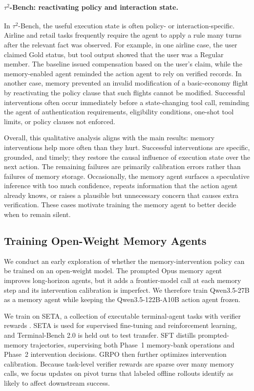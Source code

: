 \paragraph{$\tau^2$-Bench: reactivating policy and interaction state.}
In $\tau^2$-Bench, the useful execution state is often policy- or
interaction-specific. Airline and retail tasks frequently require the agent to
apply a rule many turns after the relevant fact was observed. For example, in
one airline case, the user claimed Gold status, but tool output showed that the
user was a Regular member. The baseline issued compensation based on the user's
claim, while the memory-enabled agent reminded the action agent to rely on
verified records. In another case, memory prevented an invalid modification of a
basic-economy flight by reactivating the policy clause that such flights cannot
be modified. Successful interventions often occur immediately before a
state-changing tool call, reminding the agent of authentication requirements,
eligibility conditions, one-shot tool limits, or policy clauses not enforced.

Overall, this qualitative analysis aligns with the main results: memory
interventions help more often than they hurt. Successful interventions are
specific, grounded, and timely; they restore the causal influence of execution
state over the next action. The remaining failures are primarily calibration
errors rather than failures of memory storage. Occasionally, the memory agent
surfaces a speculative inference with too much confidence, repeats information
that the action agent already knows, or raises a plausible but unnecessary
concern that causes extra verification. These cases motivate training the memory
agent to better decide when to remain silent.

\subsection{Training Open-Weight Memory Agents}
\label{sec:training}

We conduct an early exploration of whether the memory-intervention policy can be
trained on an open-weight model. The prompted Opus memory agent improves
long-horizon agents, but it adds a frontier-model call at each memory step and
its intervention calibration is imperfect. We therefore train Qwen3.5-27B as a
memory agent while keeping the Qwen3.5-122B-A10B action agent frozen.

We train on SETA, a collection of executable terminal-agent tasks with verifier
rewards \citep{seta}. SETA is used for supervised fine-tuning and reinforcement
learning, and Terminal-Bench 2.0 is held out to test transfer. SFT distills
prompted-memory trajectories, supervising both Phase~1 memory-bank operations
and Phase~2 intervention decisions. GRPO then further optimizes intervention
calibration. Because task-level verifier rewards are sparse over many memory
calls, we focus updates on pivot turns that labeled offline rollouts identify as likely to affect downstream success.

